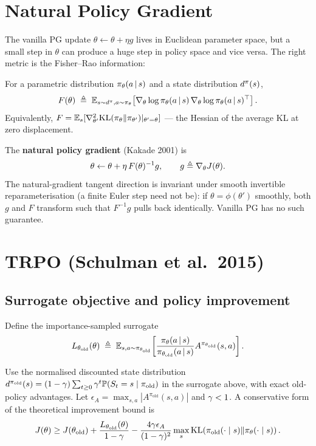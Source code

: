 \documentclass[11pt,oneside]{scrbook}
\begin{document}
\section{Natural Policy Gradient}

The vanilla PG update $\theta \leftarrow \theta + \eta g$ lives in Euclidean parameter space, but a small step in $\theta$ can produce a huge step in policy space and vice versa. The right metric is the Fisher--Rao information:

\begin{definition}
\label{def:fim}
For a parametric distribution $\pi_\theta(a\,\vert\, s)$ and a state distribution $d^\pi(s)$,
\[
  F(\theta) \;\triangleq\; \mathbb{E}_{s \sim d^\pi, a \sim \pi_\theta}\!\left[\nabla_\theta \log \pi_\theta(a\,\vert\, s)\, \nabla_\theta \log \pi_\theta(a\,\vert\, s)^\top\right].
\]
Equivalently, $F = \mathbb{E}_s[\nabla_{\theta'}^2 \mathrm{KL}(\pi_\theta \| \pi_{\theta'})|_{\theta'=\theta}]$ --- the Hessian of the average KL at zero displacement.
\end{definition}

The \textbf{natural policy gradient} (Kakade 2001) is
\[
  \theta \leftarrow \theta + \eta\, F(\theta)^{-1} g, \qquad g \triangleq \nabla_\theta J(\theta).
\]
The natural-gradient tangent direction is invariant under smooth invertible
reparameterisation (a finite Euler step need not be): if $\theta = \phi(\theta')$ smoothly, both $g$ and $F$ transform such that $F^{-1}g$ pulls back identically. Vanilla PG has no such guarantee.

\section{TRPO (Schulman et al.\ 2015)}

\subsection*{Surrogate objective and policy improvement}

Define the importance-sampled surrogate
\[
  L_{\theta_\text{old}}(\theta) \;\triangleq\; \mathbb{E}_{s, a \sim \pi_{\theta_\text{old}}}\!\left[\frac{\pi_\theta(a\,\vert\, s)}{\pi_{\theta_\text{old}}(a\,\vert\, s)} A^{\pi_{\theta_\text{old}}}(s, a)\right].
\]

\begin{theorem}
\label{thm:surrbnd}
Use the normalised discounted state distribution
$d^{\pi_\mathrm{old}}(s)=(1-\gamma)\sum_{t\ge0}\gamma^t\mathbb{P}(S_t=s\mid\pi_\mathrm{old})$
in the surrogate above, with exact old-policy advantages. Let
$\epsilon_A=\max_{s,a}|A^{\pi_\mathrm{old}}(s,a)|$ and $\gamma<1$.
A conservative form of the theoretical improvement bound is
\[
J(\theta)\ge J(\theta_\mathrm{old})+
\frac{L_{\theta_\mathrm{old}}(\theta)}{1-\gamma}
-\frac{4\gamma\epsilon_A}{(1-\gamma)^2}
\max_s\mathrm{KL}\!\left(\pi_\mathrm{old}(\cdot\mid s)\|\pi_\theta(\cdot\mid s)\right).
\]
\end{theorem}
\end{document}

